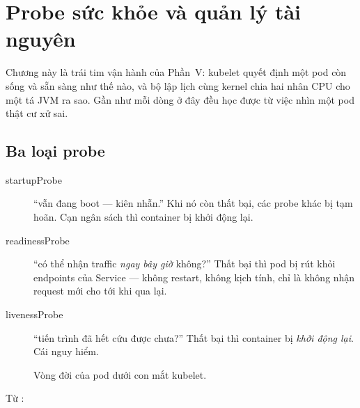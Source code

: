 \chapter{Probe sức khỏe và quản lý tài nguyên}
\label{ch:probes}

Chương này là trái tim vận hành của Phần~V: kubelet quyết định một pod
còn sống và sẵn sàng như thế nào, và bộ lập lịch cùng kernel chia hai
nhân CPU cho một tá JVM ra sao. Gần như mỗi dòng ở đây đều học được từ
việc nhìn một pod thật cư xử sai.

\section{Ba loại probe}

\begin{description}
  \item[startupProbe] ``vẫn đang boot --- kiên nhẫn.'' Khi nó còn thất
  bại, các probe khác bị tạm hoãn. Cạn ngân sách thì container bị khởi
  động lại.
  \item[readinessProbe] ``có thể nhận traffic \emph{ngay bây giờ}
  không?'' Thất bại thì pod bị rút khỏi endpoints của Service --- không
  restart, không kịch tính, chỉ là không nhận request mới cho tới khi
  qua lại.
  \item[livenessProbe] ``tiến trình đã hết cứu được chưa?'' Thất bại
  thì container bị \emph{khởi động lại}. Cái nguy hiểm.
\end{description}

\begin{figure}[h]
\centering
{}
\caption{Vòng đời của pod dưới con mắt kubelet.}
\end{figure}

Từ :

